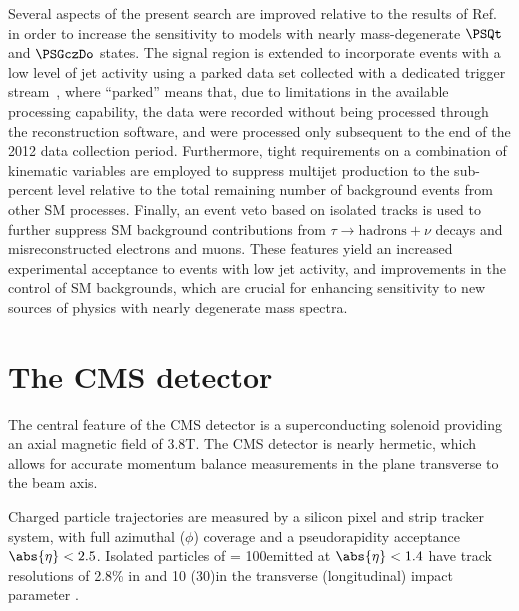 Several aspects of the present search are improved relative to the
results of Ref.~\cite{RA1Paper2012} in order to increase the
sensitivity to models with nearly mass-degenerate $\PSQt$ and
$\PSGczDo$ states. The signal region is extended to incorporate events
with a low level of jet activity using a parked data set collected
with a dedicated trigger stream~\cite{CMS:2012ooa}, where ``parked''
means that, due to limitations in the available processing capability,
the data were recorded without being processed through the
reconstruction software, and were processed only subsequent to the end
of the 2012 data collection period. Furthermore, tight requirements on
a combination of kinematic variables are employed to suppress multijet
production to the sub-percent level relative to the total remaining
number of background events from other SM processes. Finally, an event
veto based on isolated tracks is used to further suppress SM
background contributions from $\tau \to \text{hadrons} + \nu$ decays
and misreconstructed electrons and muons. These features yield an
increased experimental acceptance to events with low jet activity, and
improvements in the control of SM backgrounds, which are crucial for
enhancing sensitivity to new sources of physics with nearly degenerate
mass spectra.


\section{The CMS detector}

The central feature of the CMS detector is a superconducting solenoid
providing an axial magnetic field of 3.8\unit{T}. The CMS detector is nearly
hermetic, which allows for accurate momentum balance measurements in
the plane transverse to the beam axis.

Charged particle trajectories are measured by a silicon pixel and
strip tracker system, with full azimuthal ($\phi$) coverage and a
pseudorapidity acceptance $\abs{\eta} < 2.5$.
Isolated particles of \pt = 100\GeV emitted at $\abs{\eta} < 1.4$ have
track resolutions of 2.8\% in \pt and 10 (30)\mum in the transverse
(longitudinal) impact parameter \cite{TRK-11-001}.

